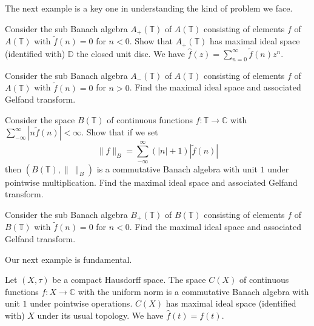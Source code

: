 The next example is a key one in understanding the kind
of problem we face.
\begin{example} Consider the sub Banach algebra $A_{+}({\mathbb T})$
of $A({\mathbb T})$ consisting of elements $f$ of $A({\mathbb T})$
with $\tilde{f}(n)=0$ for $n<0$. Show that $A_{+}({\mathbb T})$
has maximal ideal space
(identified with) ${\mathbb D}$ the closed unit disc.
We have $\hat{f}(z)=\sum_{n=0}^{\infty}\tilde{f}(n)z^{n}$.
\end{example}
\begin{exercise} Consider the sub Banach algebra $A_{-}({\mathbb T})$
of $A({\mathbb T})$ consisting of elements $f$ of $A({\mathbb T})$
with $\tilde{f}(n)=0$ for $n>0$. Find the maximal ideal
space and associated Gelfand transform.
\end{exercise}
\begin{exercise} Consider the space $B({\mathbb T})$
of continuous functions $f:{\mathbb T}\rightarrow{\mathbb C}$
with
$\sum_{-\infty}^{\infty}|n\tilde{f}(n)|<\infty$.
Show that if we set
\[\|f\|_{B}=\sum_{-\infty}^{\infty}(|n|+1)|\tilde{f}(n)|\]
then $(B({\mathbb T}),\|\ \|_{B})$ is a commutative
Banach algebra with unit $1$ under pointwise multiplication.
Find the maximal ideal
space and associated Gelfand transform.
\end{exercise}
\begin{exercise} Consider the sub Banach algebra $B_{+}({\mathbb T})$
of $B({\mathbb T})$ consisting of elements $f$ of $B({\mathbb T})$
with $\tilde{f}(n)=0$ for $n<0$. Find the maximal ideal
space and associated Gelfand transform.
\end{exercise}

Our next example is fundamental.
\begin{example} Let $(X,\tau)$ be a compact Hausdorff
space. The space $C(X)$
of continuous functions $f:X\rightarrow{\mathbb C}$
with the uniform norm is a commutative
Banach algebra with unit $1$ under pointwise operations.
$C(X)$ has maximal ideal space
(identified with) $X$ under its usual topology.
We have $\hat{f}(t)=f(t)$.
\end{example}

